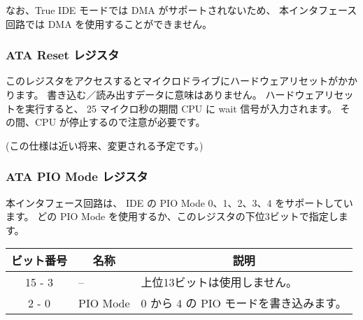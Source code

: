 なお、True IDE モードでは DMA がサポートされないため、
本インタフェース回路では DMA を使用することができません。

\subsubsection{ATA Reset レジスタ}

このレジスタをアクセスするとマイクロドライブにハードウェアリセットがかかります。
書き込む／読み出すデータに意味はありません。
ハードウェアリセットを実行すると、
25 マイクロ秒の期間 CPU に wait 信号が入力されます。
その間、CPU が停止するので注意が必要です。

(この仕様は近い将来、変更される予定です。)

\subsubsection{ATA PIO Mode レジスタ}

本インタフェース回路は、
IDE の PIO Mode 0、1、2、3、4 をサポートしています。
どの PIO Mode を使用するか、このレジスタの下位3ビットで指定します。

\begin{center}
\begin{tabular}{|c|l|l|}
\hline
ビット番号 & \multicolumn{1}{|c|}{名称} & \multicolumn{1}{|c|}{説明} \\
\hline
15 - 3     &  --          & 上位13ビットは使用しません。\\
\hline
2 - 0      &  PIO Mode    & 0 から 4 の PIO モードを書き込みます。\\
\hline
\end{tabular}
\end{center}
